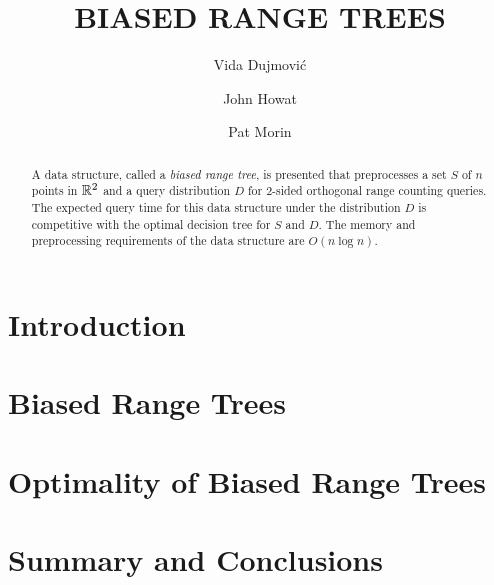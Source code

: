 \documentclass[lotsofwhite,charterfonts]{patmorin}
\title{\MakeUppercase{Biased Range Trees}}
\author{Vida Dujmovi\'c
	\and John Howat
	\and Pat Morin}
\begin{document}
\maketitle
\begin{abstract}
A data structure, called a \emph{biased range tree}, 
is presented that preprocesses a set $S$ of $n$ points in $\mathbb{R}^2$
and a query distribution $D$ for 2-sided orthogonal range counting
queries.  The expected query time for this data structure under the
distribution $D$ is competitive with the optimal decision tree for $S$
and $D$.   The memory and preprocessing requirements of the data
structure are $O(n\log n)$.
\end{abstract}

\section{Introduction}


\section{Biased Range Trees}


\section{Optimality of Biased Range Trees}


\section{Summary and Conclusions}
\end{document}
